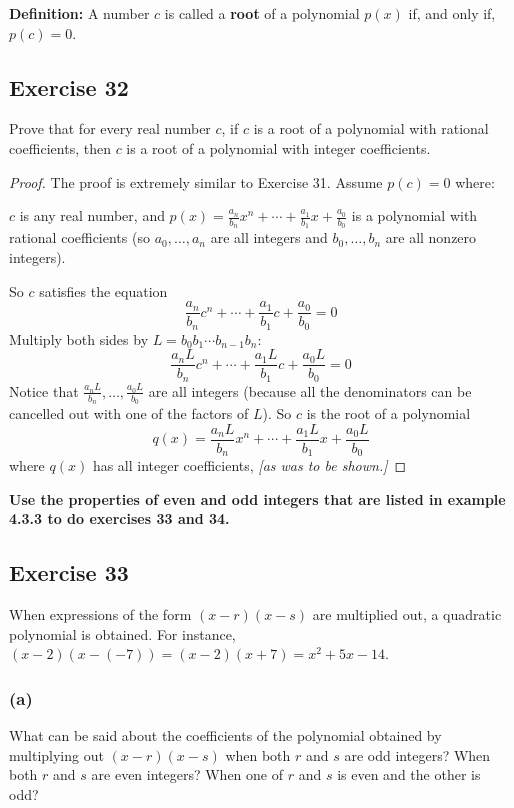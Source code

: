 \documentclass[14pt]{extarticle}
\newcommand{\dps}{\displaystyle}
\newcommand{\cy}{\color{cyan}}
\begin{document}
\begin{tcolorbox}[colframe=cyan]
    {\bf \cy Definition:} A number $c$ is called a {\bf root} of a polynomial $p(x)$ if, and only if, $p(c) = 0$.
\end{tcolorbox}

\subsection{Exercise 32}
Prove that for every real number $c$, if $c$ is a root of a polynomial with rational coefficients, then $c$ is a root of a polynomial with integer coefficients.

\begin{proof}
    The proof is extremely similar to Exercise 31. Assume $p(c) = 0$ where:

    $c$ is any real number, and $p(x) = \dps\frac{a_n}{b_n}x^n + \cdots + \frac{a_1}{b_1}x + \frac{a_0}{b_0}$ is a polynomial with rational coefficients (so $a_0, \ldots, a_n$ are all integers and $b_0, \ldots, b_n$ are all nonzero integers).

    So $c$ satisfies the equation
    \[
        \frac{a_n}{b_n}c^n + \cdots + \frac{a_1}{b_1}c + \frac{a_0}{b_0} = 0
    \]
    Multiply both sides by $L = b_0b_1\cdots b_{n-1}b_n$:
    \[
        \frac{a_n L}{b_n}c^n + \cdots + \frac{a_1 L}{b_1}c + \frac{a_0 L}{b_0} = 0
    \]
    Notice that $\dps\frac{a_nL}{b_n}, \ldots, \frac{a_0L}{b_0}$ are all integers (because all the denominators can be cancelled out with one of the factors of $L$). So $c$ is the root of a polynomial
    \[
        q(x) = \frac{a_n L}{b_n}x^n + \cdots + \frac{a_1 L}{b_1}x + \frac{a_0 L}{b_0}
    \]
    where $q(x)$ has all integer coefficients, {\it [as was to be shown.]}
\end{proof}

{\bf \cy Use the properties of even and odd integers that are listed in example 4.3.3 to do exercises 33 and 34.}

\subsection{Exercise 33}
When expressions of the form $(x - r)(x - s)$ are multiplied out, a quadratic polynomial is obtained. For instance, $(x - 2)(x - (-7)) = (x - 2)(x + 7) = x^2 + 5x - 14$.

\subsubsection{(a)}
What can be said about the coefficients of the polynomial obtained by multiplying out $(x - r)(x - s)$ when both $r$ and $s$ are odd integers? When both $r$ and $s$ are even integers? When one of $r$ and $s$ is even and the other is odd?
\end{document}
